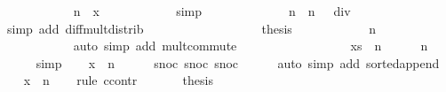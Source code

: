 \begin{isabellebody}
\ \ \ \ \ \ \ \ \ \ \isamarkupfalse%
\ {\isacharbackquoteopen}n\ {\isasymle}\ x{\isacharbackquoteclose}\isanewline
\ \ \ \ \ \ \ \ \ \ \isamarkupfalse%
\ simp\isanewline
\ \ \ \ \ \ \ \ \isamarkupfalse%
\ \isamarkupfalse%
\ {\isachardoublequoteopen}{\isachardot}{\isachardot}{\isachardot}\ {\isacharequal}\ n\ {\isacharasterisk}\ {\isacharparenleft}n\ {\isacharminus}\ {}{\isacharparenright}\ div\ {}{\isachardoublequoteclose}\isanewline
\ \ \ \ \ \ \ \ \ \ \isamarkupfalse%
\ {\isacharparenleft}simp\ add{\isacharcolon}\ diff{\isacharunderscore}mult{\isacharunderscore}distrib{}{\isacharparenright}\isanewline
\ \ \ \ \ \ \ \ \isamarkupfalse%
\isanewline
\ \ \ \ \ \ \ \ \isamarkupfalse%
\ {\isacharquery}thesis\isanewline
\ \ \ \ \ \ \ \ \ \ \isamarkupfalse%
\ {\isacharbackquoteopen}n\ {\isachargreater}\ {}{\isacharbackquoteclose}\isanewline
\ \ \ \ \ \ \ \ \ \ \isamarkupfalse%
\ {\isacharparenleft}auto\ simp\ add{\isacharcolon}\ mult{\isachardot}commute{\isacharparenright}\isanewline
\ \ \ \ \ \ \isamarkupfalse%
\isanewline
\ \ \ \ \isamarkupfalse%
\isanewline
\ \ \isamarkupfalse%
\isanewline
\ \ \isamarkupfalse%
\ {\isachardoublequoteopen}xs\ {\isacharequal}\ {\isacharbrackleft}{}{\isachardot}{\isachardot}{\isacharless}n{\isacharbrackright}{\isachardoublequoteclose}\isanewline
\ \ \ \ \isamarkupfalse%
\ {\isacharbackquoteopen}n\ {\isachargreater}\ {}{\isacharbackquoteclose}\isanewline
\ \ \ \ \isamarkupfalse%
\ simp\isanewline
\ \ \isamarkupfalse%
\ {\isachardoublequoteopen}x\ {\isasymge}\ n{\isachardoublequoteclose}\isanewline
\ \ \ \ \isamarkupfalse%
\ snoc{\isacharparenleft}{}{\isacharparenright}\ snoc{\isacharparenleft}{}{\isacharparenright}\ snoc{\isacharparenleft}{}{\isacharparenright}\isanewline
\ \ \ \ \isamarkupfalse%
\ {\isacharparenleft}auto\ simp\ add{\isacharcolon}\ sorted{\isacharunderscore}append{\isacharparenright}\isanewline
\ \ \isamarkupfalse%
\ {\isachardoublequoteopen}x\ {\isacharequal}\ n{\isachardoublequoteclose}\isanewline
\ \ \isamarkupfalse%
\ {\isacharparenleft}rule\ ccontr{\isacharparenright}\isanewline
\ \ \ \ \isamarkupfalse%
\ {\isachardoublequoteopen}{\isasymnot}\ {\isacharquery}thesis{\isachardoublequoteclose}\isanewline

\end{isabellebody}
